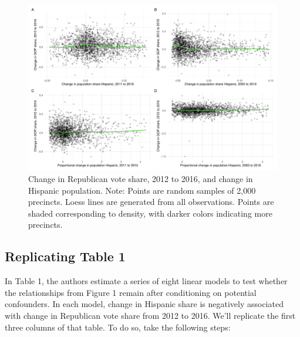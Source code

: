 \documentclass[12pt,halfline,a4paper,]{ouparticle}
\begin{document}
\begin{figure}[p]
\includegraphics[width=1\linewidth]{hill-hopkins-huber-answer-key_files/figure-latex/arrange plots with patchwork-1} \caption{Change in Republican vote share, 2012 to 2016, and change in Hispanic population. Note: Points are random samples of 2,000 precincts. Loess lines are generated from all observations. Points are shaded corresponding to density, with darker colors indicating more precincts.}\label{fig:arrange plots with patchwork}
\end{figure}

\hypertarget{replicating-table-1}{%
\subsection{Replicating Table 1}\label{replicating-table-1}}

In Table 1, the authors estimate a series of eight linear models to test
whether the relationships from Figure 1 remain after conditioning on
potential confounders. In each model, change in Hispanic share is
negatively associated with change in Republican vote share from 2012 to
2016. We'll replicate the first three columns of that table. To do so,
take the following steps:
\end{document}
